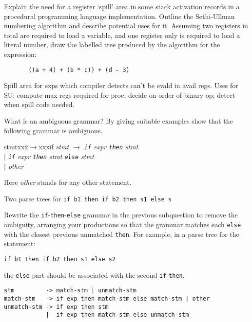 \begin{questions}
\begin{subquestions}
\subquestion
Explain the need for a register `spill' area
in some stack activation records in a procedural
programming language implementation. 
Outline the Sethi-Ullman numbering algorithm and
describe potential uses for it.  Assuming two registers in total
are required to load a variable, and one register only
is required to load a literal number, draw the labelled
tree produced by the algorithm for the expression:
\begin{verbatim}
       ((a + 4) + (b * c)) + (d - 3)
\end{verbatim}
\begin{modelanswer}
Spill area for exps which compiler detects can't be evald in
avail regs. Uses for SU: compute max regs required for proc;
decide on order of binary op;
detect when spill code needed.
\end{modelanswer}


\end{subquestions}

 
\question

\begin{subquestions}

\subquestion

What is an ambiguous grammar? By giving suitable examples show that the
        following grammar is ambiguous. 
\begin{tabbing}
stmtxxx\=$\rightarrow$xxx\=if\kill
\it
stmt \> $\rightarrow$ \> \verb"if" {\it expr\/} \verb"then" {\it stmt} \\
\it
     \> $\mid$ \> \verb"if" {\it expr\/} \verb"then" {\it stmt\/} \verb"else" {\it stmt} \\
     \> $\mid$ \> {\it other}
\end{tabbing}
Here {\it other\/} stands for any other statement.
\begin{modelanswer}
Two parse trees for \verb"if b1 then if b2 then s1 else s"
\end{modelanswer}

\subquestion Rewrite the \verb"if"-\verb"then"-\verb"else" grammar in the
previous subquestion to remove the ambiguity, arranging your productions
so that the grammar matches each \verb"else" with the closest previous
unmatched \verb"then".
For example, in a parse tree for the statement:
\begin{verbatim}
if b1 then if b2 then s1 else s2
\end{verbatim}
the \verb"else" part should be associated with the 
second \verb"if"-\verb"then". 
\begin{modelanswer}
\begin{verbatim}
stm         -> match-stm | unmatch-stm
match-stm   -> if exp then match-stm else match-stm | other
unmatch-stm -> if exp then stm
            |  if exp then match-stm else unmatch-stm
\end{verbatim}
\end{modelanswer}



\end{subquestions}
\end{questions}
